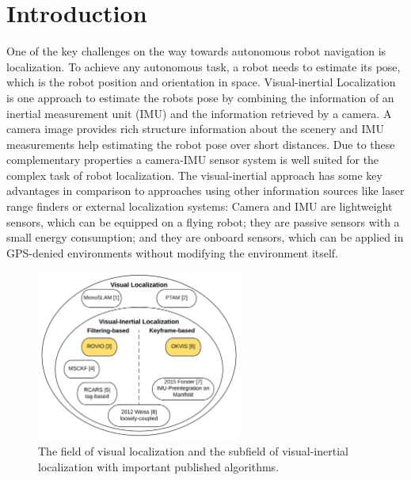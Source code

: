 \chapter{Introduction}
\label{sec:introduction}

One of the key challenges on the way towards autonomous robot navigation is localization. To achieve any autonomous task, a robot needs to estimate its pose, which is the robot position and orientation in space. Visual-inertial Localization is one approach to estimate the robots pose by combining the information of an inertial measurement unit (IMU) and the information retrieved by a camera. A camera image provides rich structure information about the scenery and IMU measurements help estimating the robot pose over short distances. Due to these complementary properties a camera-IMU sensor system is well suited for the complex task of robot localization. The visual-inertial approach has some key advantages in comparison to approaches using other information sources like laser range finders or external localization systems: Camera and IMU are lightweight sensors, which can be equipped on a flying robot; they are passive sensors with a small energy consumption; and they are onboard sensors, which can be applied in GPS-denied environments without modifying the environment itself. \\


\begin{figure}[h]
   \centering
   \includegraphics[width=0.6\textwidth]{images/state_of_the_art.png}
   \caption{The field of visual localization and the subfield of visual-inertial localization with important published algorithms.}
   \label{pics:state_of_the_art}
\end{figure}

